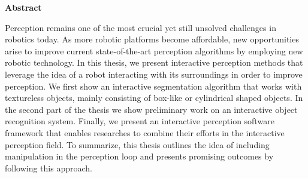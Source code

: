 \clearemptydoublepage
{}
{}

\vspace*{1cm}
\begin{center}
{\Large \bf Abstract}
\end{center}
\vspace{1cm}

Perception remains one of the most crucial yet still unsolved challenges in robotics today. As more robotic platforms become affordable, new opportunities arise to improve current state-of-the-art perception algorithms by employing new robotic technology. In this thesis, we present interactive perception methods that leverage the idea of a robot interacting with its surroundings in order to improve perception. We first show an interactive segmentation algorithm that works with textureless objects, mainly consisting of box-like or cylindrical shaped objects. In the second part of the thesis we show preliminary work on an interactive object recognition system. Finally, we present an interactive perception software framework that enables researches to combine their efforts in the interactive perception field. To summarize, this thesis outlines the idea of including manipulation in the perception loop and presents promising outcomes by following this approach.





